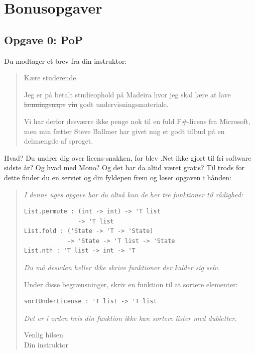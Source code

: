 \section{\huge{Bonusopgaver}}

\subsection{Opgave 0: PoP}

Du modtager et brev fra din instruktor:

\begin{quote}

\em

Kære studerende

Jeg er på betalt studieophold på Madeira hvor jeg skal lære at lave
\sout{honningsnaps} \hspace{1mm} \sout{vin} \hspace{1mm} godt
undervisningsmateriale.

Vi har derfor desværre ikke penge nok til en fuld F\#-licens fra Microsoft, men
min fætter Steve Ballmer har givet mig et godt tilbud på en delmængde af
sproget.

\end{quote}

Hvad?  Du undrer dig over licens-snakken, for blev .Net ikke gjort til fri
software sidste år?  Og hvad med Mono?  Og det har da altid været gratis?  Til
trods for dette finder du en serviet og din fyldepen frem og løser opgaven i
hånden:

\begin{quote}

{\em I denne uges opgave har du altså kun de her tre funktioner til rådighed:}

\begin{verbatim}
List.permute : (int -> int) -> 'T list
               -> 'T list
List.fold : ('State -> 'T -> 'State)
            -> 'State -> 'T list -> 'State
List.nth : 'T list -> int -> 'T
\end{verbatim}

{\em Du må desuden heller ikke skrive funktioner der kalder sig selv.

Under disse begrænsninger, skriv en funktion til at sortere elementer:}

\begin{verbatim}
sortUnderLicense : 'T list -> 'T list
\end{verbatim}

{\em Det er i orden hvis din funktion ikke kan sortere lister med dubletter.

Venlig hilsen\\
Din instruktor}

\end{quote}



